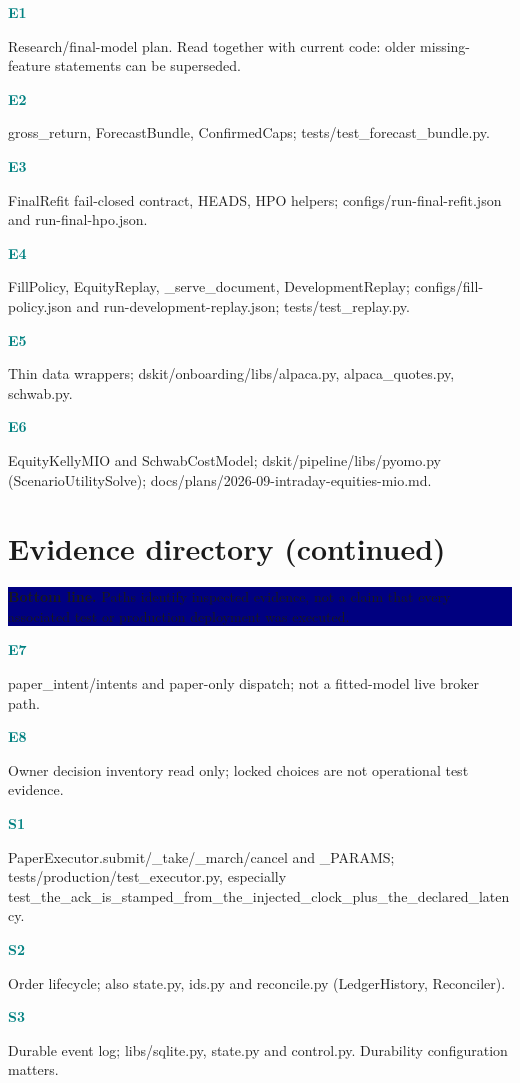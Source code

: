 \documentclass[10pt,letterpaper]{article}
\newcommand{\bl}[1]{\noindent\colorbox{navy}{\parbox{\dimexpr\linewidth-2\fboxsep}{\color{white}\textbf{Bottom line.} #1}}\par\medskip}
\newcommand{\topic}[2]{\clearpage\section{#1}\bl{#2}}
\newcommand{\sub}[1]{\par\textbf{\textcolor{teal}{#1}}\par}
\begin{document}
\sub{E1}
{\small{}}\par
Research/final-model plan. Read together with current code: older missing-feature statements can be superseded.
\sub{E2}
{\small{}}\par
gross\_return, ForecastBundle, ConfirmedCaps; tests/test\_forecast\_bundle.py.
\sub{E3}
{\small{}}\par
FinalRefit fail-closed contract, HEADS, HPO helpers; configs/run-final-refit.json and run-final-hpo.json.
\sub{E4}
{\small{}}\par
FillPolicy, EquityReplay, \_serve\_document, DevelopmentReplay; configs/fill-policy.json and run-development-replay.json; tests/test\_replay.py.
\sub{E5}
{\small{}}\par
Thin data wrappers; dskit/onboarding/libs/alpaca.py, alpaca\_quotes.py, schwab.py.
\sub{E6}
{\small{}}\par
EquityKellyMIO and SchwabCostModel; dskit/pipeline/libs/pyomo.py (ScenarioUtilitySolve); docs/plans/2026-09-intraday-equities-mio.md.
\topic{Evidence directory (continued)}{Paths identify inspected evidence, not a claim that every associated test or production deployment was executed.}
\sub{E7}
{\small{}}\par
paper\_intent/intents and paper-only dispatch; not a fitted-model live broker path.
\sub{E8}
{\small{}}\par
Owner decision inventory read only; locked choices are not operational test evidence.
\sub{S1}
{\small{}}\par
PaperExecutor.submit/\_take/\_march/cancel and \_PARAMS; tests/production/test\_executor.py, especially test\_the\_ack\_is\_stamped\_from\_the\_injected\_clock\_plus\_the\_declared\_latency.
\sub{S2}
{\small{}}\par
Order lifecycle; also state.py, ids.py and reconcile.py (LedgerHistory, Reconciler).
\sub{S3}
{\small{}}\par
Durable event log; libs/sqlite.py, state.py and control.py. Durability configuration matters.
\end{document}
